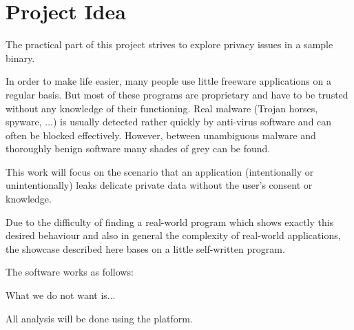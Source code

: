 \section{Project Idea}\label{sec:proj}

The practical part of this project strives to explore privacy issues in a sample binary.

In order to make life easier, many people use little freeware applications on a regular basis.
But most of these programs are proprietary and have to be trusted without any knowledge of their functioning.
Real malware (Trojan horses, spyware, ...) is usually detected rather quickly by anti-virus software and can often be blocked effectively.
However, between unambiguous malware and thoroughly benign software many shades of grey can be found.

This work will focus on the scenario that an application (intentionally or unintentionally) leaks delicate private data without the user's consent or knowledge.


Due to the difficulty of finding a real-world program which shows exactly this desired behaviour and also in general the complexity of real-world applications, the showcase described here bases on a little self-written program.

The software works as follows:

What we do not want is...


All analysis will be done using the \sse platform.

\iffalse
§4	Project idea: explore privacy issues in a sample binary
		> Plan darlegen: Programme könnten unerwünscht Infos preisgeben.
		> Daher: Eigenes kleines Programm, das … macht.
\fi